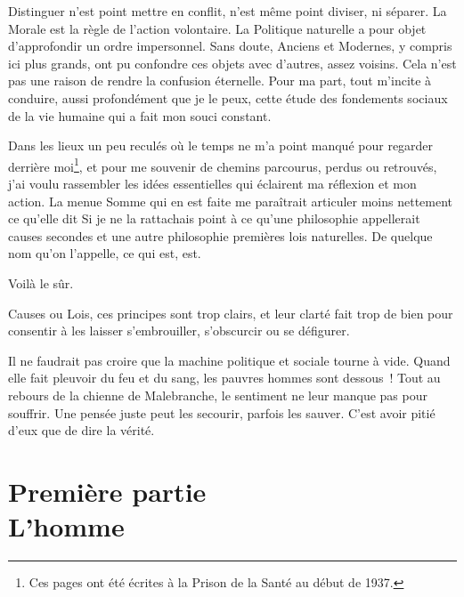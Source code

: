 \documentclass[french,twoside]{book} %
\newcommand\chapteropen{} %
\newcommand\chaptercont{} %
\newcommand\chapterclose{} %
\begin{document}
Distinguer n’est point mettre en conflit, n’est même point diviser, ni séparer. La Morale est la règle de l’action volontaire. La Politique naturelle a pour objet d’approfondir un ordre impersonnel. Sans doute, Anciens et Modernes, y compris ici plus grands, ont pu confondre ces objets avec d’autres, assez voisins. Cela n’est pas une raison de rendre la confusion éternelle. Pour ma part, tout m’incite à conduire, aussi profondément que je le peux, cette étude des fondements sociaux de la vie humaine qui a fait mon souci constant.\par
Dans les lieux un peu reculés où le temps ne m’a point manqué pour regarder derrière moi\footnote{Ces pages ont été écrites à la Prison de la Santé au début de 1937.}, et pour me souvenir de chemins parcourus, perdus ou retrouvés, j’ai voulu rassembler les idées essentielles qui éclairent ma réflexion et mon action. La menue Somme qui en est faite me paraîtrait articuler moins nettement ce qu’elle dit Si je ne la rattachais point à ce qu’une philosophie appellerait causes secondes et une autre philosophie premières lois naturelles. De quelque nom qu’on l’appelle, ce qui est, est.\par
Voilà le sûr.\par
Causes ou Lois, ces principes sont trop clairs, et leur clarté fait trop de bien pour consentir à les laisser s’embrouiller, s’obscurcir ou se défigurer.\par
Il ne faudrait pas croire que la machine politique et sociale tourne à vide. Quand elle fait pleuvoir du feu et du sang, les pauvres hommes sont dessous ! Tout au rebours de la chienne de Malebranche, le sentiment ne leur manque pas pour souffrir. Une pensée juste peut les secourir, parfois les sauver. C’est avoir pitié d’eux que de dire la vérité.\par
\bigbreak
\bigbreak
\chapterclose


\chapteropen
\chapter[{Première partie. L’homme}]{Première partie \\
L’homme}\renewcommand{\leftmark}{Première partie \\
L’homme}


\chaptercont
\end{document}
